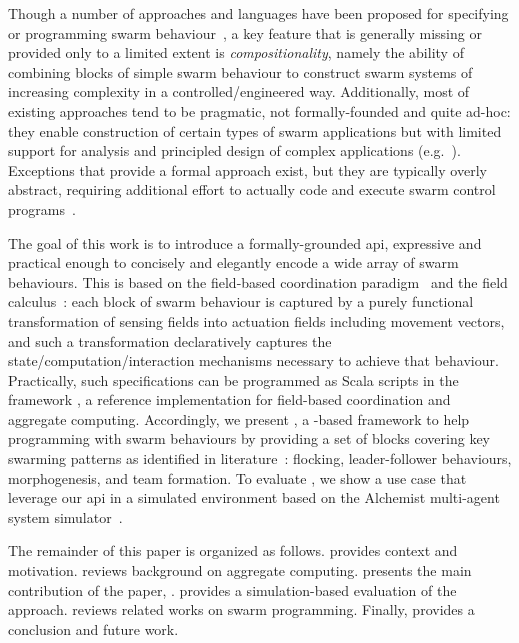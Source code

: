 %
Though a number of approaches and languages have been proposed 
 for specifying or programming swarm behaviour~\cite{Meld2007,%
DBLP:conf/icra/CarrollNS21,%
paros,%
DBLP:conf/isola/KosakHBWHR20,%
Koutsoubelias2016tecola,%
lima2018dolphin,%
Mottola2014voltron,%
DBLP:conf/iros/PinciroliB16,%
DBLP:conf/iros/YiDLD0WY20},
 a key feature that is generally missing or provided only to a limited extent
 is \emph{compositionality},
 namely the ability of combining blocks of simple swarm behaviour to construct swarm systems of increasing complexity in a controlled/engineered way.
%
Additionally, most of existing approaches tend to be pragmatic, not formally-founded and quite ad-hoc: they 
 enable construction of certain types of swarm applications
 but with limited support for analysis and principled design of complex applications (e.g.~\cite{lima2018dolphin,paros,DBLP:conf/iros/PinciroliB16,DBLP:conf/icra/CarrollNS21}).
%
Exceptions that provide a formal approach exist, but they are typically overly abstract, requiring additional effort to actually code and execute swarm control programs~\cite{DBLP:journals/csur/LuckcuckFDDF19}.

The goal of this work is 
 to introduce a formally-grounded \ac{api},
 expressive and practical enough
 to concisely and elegantly encode a wide array of swarm behaviours.
%
This is based on the field-based coordination paradigm~\cite{DBLP:journals/jlap/ViroliBDACP19} and the field calculus~\cite{AVDPB-TOCL2019}:
each block of swarm behaviour is captured by a purely functional transformation of sensing fields into actuation fields including movement vectors,
and such a transformation declaratively captures the state/computation/interaction mechanisms necessary to achieve that behaviour.
%
Practically, such specifications can be programmed as Scala scripts in the \scafi{} framework \cite{DBLP:journals/softx/CasadeiVAP22,ACDV-LMCS2023}, a reference implementation for field-based coordination and aggregate computing.
%
Accordingly, we present \MacroSwarm{}, a \scafi{}-based framework to help programming with swarm behaviours by providing a set of blocks covering key swarming patterns as identified in literature~\cite{DBLP:journals/swarm/BrambillaFBD13}: flocking, leader-follower behaviours, morphogenesis, and team formation.
%
To evaluate \MacroSwarm{}, we show a use case that leverage our \ac{api} 
 in a simulated environment based on the Alchemist multi-agent system simulator~\cite{DBLP:journals/jos/PianiniMV13}.

The remainder of this paper is organized as follows.
%
 provides context and motivation.
%
 reviews background on aggregate computing.
%
 presents the main contribution of the paper, \MacroSwarm{}.
%
 provides a simulation-based evaluation of the approach.
%
 reviews related works on swarm programming.
%
Finally,  provides a conclusion and future work.

